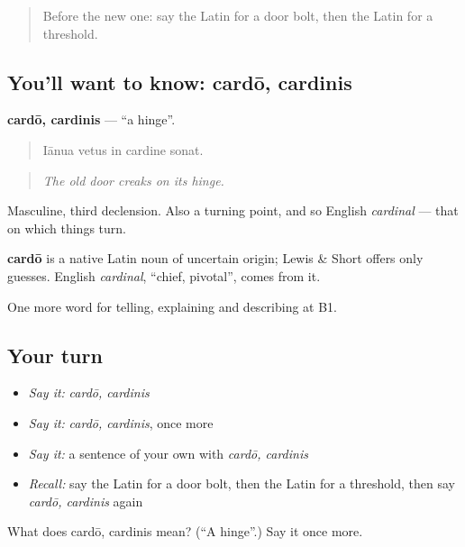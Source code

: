 \begin{quote}
Before the new one: say the Latin for a door bolt, then the Latin for a threshold.
\end{quote}

\subsection*{You'll want to know: cardō, cardinis}
\textbf{cardō, cardinis} — \textquotedblleft{}a hinge\textquotedblright{}.

\begin{quote}
Iānua vetus in cardine sonat.
\end{quote}

\begin{quote}
\emph{The old door creaks on its hinge.}
\end{quote}

Masculine, third declension. Also a turning point, and so English \emph{cardinal} — that on which things turn.

\begin{cousinweb}
\textbf{cardō} is a native Latin noun of uncertain origin; Lewis \& Short offers only guesses. English \emph{cardinal}, \textquotedblleft{}chief, pivotal\textquotedblright{}, comes from it.
\end{cousinweb}

\begin{grammarlens}[title={What you've built}]
One more word for telling, explaining and describing at B1.
\end{grammarlens}

\subsection*{Your turn}
\begin{itemize}
\raggedright
  \item \emph{Say it:} \emph{cardō, cardinis}
  \item \emph{Say it:} \emph{cardō, cardinis}, once more
  \item \emph{Say it:} a sentence of your own with \emph{cardō, cardinis}
  \item \emph{Recall:} say the Latin for a door bolt, then the Latin for a threshold, then say \emph{cardō, cardinis} again
\end{itemize}

\begin{tcolorbox}[breakable,colback=teal!4,colframe=teal!35!black,title={Before you move on}]
What does cardō, cardinis mean? (\textquotedblleft{}A hinge\textquotedblright{}.) Say it once more.
\end{tcolorbox}
